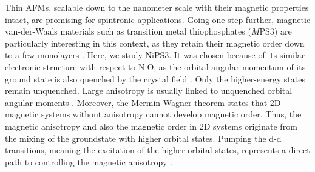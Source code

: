 Thin AFMs, scalable down to the nanometer scale with their magnetic properties intact, are promising for spintronic applications.
Going one step further, magnetic van-der-Waals materials such as transition metal thiophosphates ($M$PS3) are particularly interesting in this context, as they retain their magnetic order down to a few monolayers \cite{kim_suppression_2019}.
Here, we study NiPS3.
It was chosen because of its similar electronic structure with respect to NiO, as the orbital angular momentum of its ground state is also quenched by the crystal field \cite{ogale_functional_2013}.
Only the higher-energy states remain unquenched.
Large anisotropy is usually linked to unquenched orbital angular moments \cite{afanasiev_controlling_2021}.
Moreover, the Mermin-Wagner theorem states that 2D magnetic systems without anisotropy cannot develop magnetic order.
Thus, the magnetic anisotropy and also the magnetic order in 2D systems originate from the mixing of the groundstate with higher orbital states.
Pumping the d-d transitions, meaning the excitation of the higher orbital states, represents a direct path to controlling the magnetic anisotropy \cite{afanasiev_controlling_2021}.




